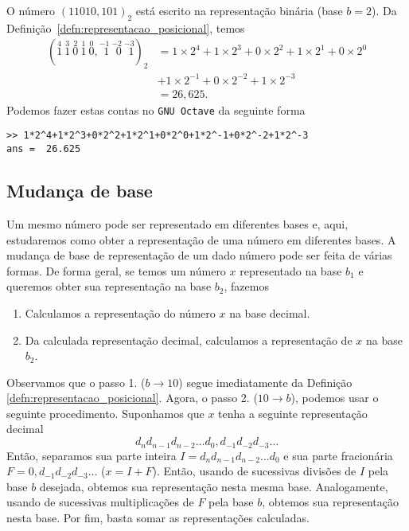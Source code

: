 \begin{ex}\label{ex:base_binaria}
  O número $(11010,101)_2$ está escrito na representação binária (base $b=2$). Da Definição~\ref{defn:representacao_posicional}, temos
  \begin{align}
    (\stackrel{4}{1}~\stackrel{3}{1}~\stackrel{2}{0}~\stackrel{1}{1}~\stackrel{0}{0},\stackrel{-1}{~\,1}~\stackrel{-2}{~\,0}~\stackrel{-3}{~\,1})_2 &= 1\times 2^4 + 1\times 2^3 + 0\times 2^2 + 1\times 2^1 + 0\times 2^0\\
    &+ 1\times 2^{-1} + 0\times 2^{-2} + 1\times 2^{-3}\\
    &= 26,625.
  \end{align}
\ifisoctave
Podemos fazer estas contas no \verb+GNU Octave+ da seguinte forma
\begin{verbatim}
>> 1*2^4+1*2^3+0*2^2+1*2^1+0*2^0+1*2^-1+0*2^-2+1*2^-3
ans =  26.625
\end{verbatim}
\fi
\end{ex}

\subsection{Mudança de base}

Um mesmo número pode ser representado em diferentes bases e, aqui, estudaremos como obter a representação de uma número em diferentes bases. A mudança de base de representação de um dado número pode ser feita de várias formas. De forma geral, se temos um número $x$ representado na base $b_1$ e queremos obter sua representação na base $b_2$, fazemos
\begin{enumerate}[1.]
\item Calculamos a representação do número $x$ na base decimal.
\item Da calculada representação decimal, calculamos a representação de $x$ na base $b_2$.
\end{enumerate}
Observamos que o passo 1. ($b \to 10$) segue imediatamente da Definição \ref{defn:representacao_posicional}. Agora, o passo 2. ($10\to b$), podemos usar o seguinte procedimento. Suponhamos que $x$ tenha a seguinte representação decimal
\begin{equation}
  d_nd_{n-1}d_{n-2}\ldots d_0,d_{-1}d_{-2}d_{-3}\ldots
\end{equation}
Então, separamos sua parte inteira $I = d_nd_{n-1}d_{n-2}\ldots d_0$ e sua parte fracionária $F = 0,d_{-1}d_{-2}d_{-3}\ldots$ ($x = I + F$). Então, usando de sucessivas divisões de $I$ pela base $b$ desejada, obtemos sua representação nesta mesma base. Analogamente, usando de sucessivas multiplicações de $F$ pela base $b$, obtemos sua representação nesta base. Por fim, basta somar as representações calculadas.

